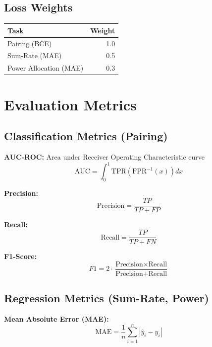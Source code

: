 \subsection{Loss Weights}
\begin{table}[H]
\centering
\begin{tabular}{lr}
\toprule
\textbf{Task} & \textbf{Weight} \\
\midrule
Pairing (BCE) & 1.0 \\
Sum-Rate (MAE) & 0.5 \\
Power Allocation (MAE) & 0.3 \\
\bottomrule
\end{tabular}
\end{table}

\section{Evaluation Metrics}

\subsection{Classification Metrics (Pairing)}

\textbf{AUC-ROC:} Area under Receiver Operating Characteristic curve
\begin{equation}
\text{AUC} = \int_{0}^{1} \text{TPR}(\text{FPR}^{-1}(x)) dx
\end{equation}

\textbf{Precision:}
\begin{equation}
\text{Precision} = \frac{TP}{TP + FP}
\end{equation}

\textbf{Recall:}
\begin{equation}
\text{Recall} = \frac{TP}{TP + FN}
\end{equation}

\textbf{F1-Score:}
\begin{equation}
F1 = 2 \cdot \frac{\text{Precision} \times \text{Recall}}{\text{Precision} + \text{Recall}}
\end{equation}

\subsection{Regression Metrics (Sum-Rate, Power)}

\textbf{Mean Absolute Error (MAE):}
\begin{equation}
\text{MAE} = \frac{1}{n} \sum_{i=1}^{n} |\hat{y}_i - y_i|
\end{equation}

